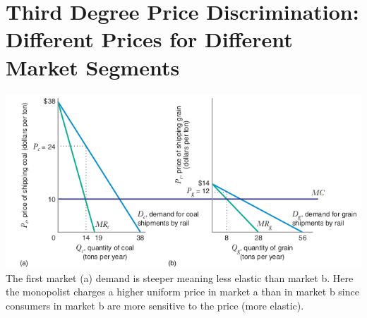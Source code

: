 \documentclass[../ECON-281-Notes.tex]{subfiles}
\begin{document}
\section{Third Degree Price Discrimination: Different Prices for Different Market Segments}
\includegraphics[width=\columnwidth]{assets/image_2021-11-30-11-43-03.png}
The first market (a) demand is steeper meaning less elastic than market b. Here the monopolist charges a higher uniform price in market a than in market b since consumers in market b are more sensitive to the price (more elastic).
\end{document}
